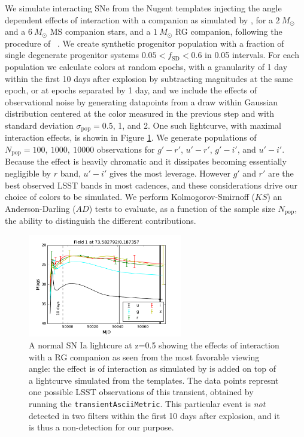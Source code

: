 We simulate interacting SNe from the Nugent templates \citep{Nugent02}
injecting the angle dependent effects of interaction with a companion
as simulated by \citep{Kasen10}, for a $2~M_\odot$ and a $6~M_\odot$
MS companion stars, and a $1~M_\odot$ RG companion, following the
procedure of ~\citep{Bianco11}. We create synthetic progenitor
population with a fraction of single degenerate progenitor systems
$0.05 < f_\mathrm{SD} < 0.6 $ in 0.05 intervals. For each population
we calculate colors at random epochs, with a granularity of 1 day
within the first 10 days after explosion by subtracting magnitudes at
the same epoch, or at epochs separated by 1 day, and we include the
effects of observational noise by generating datapoints from a draw
within Gaussian distribution centered at the color measured in the
previous step and with standard deviation $\sigma_\mathrm{pop} = 0.5$,
1, and 2. One such lightcurve, with maximal interaction effects, is showin in Figure \ref{fig:kasenlc}.
We generate populations of $N_\mathrm{pop}=100,
~1000,~10000$ observations for $g'-r'$, $u'-r'$, $g'-i'$, and
$u'-i'$. Because the effect is heavily chromatic and it dissipates
becoming essentially negligible by $r$ band, $u'-i'$ gives the most
leverage. However $g'$ and $r'$ are the best observed LSST bands in
most cadences, and these considerations drive our choice of colors to
be simulated. We perform Kolmogorov-Smirnoff ($KS$) an
Anderson-Darling ($AD$) tests to evaluate, as a function of the sample
size $N_\mathrm{pop}$, the ability to distinguish the different
contributions.

\begin{figure}[hbt]
\centerline{
\includegraphics[width=0.6\textwidth]{figs/transients/LSST_Kasen_lcv0.pdf}
}
\caption{ A normal SN Ia lightcure at z=0.5 showing the effects of
interaction with a RG companion as seen from the most favorable viewing
angle: the effect is of interaction as simulated by \citet{Kasen10} is
added on top of a lightcurve simulated from the \citealt{Nugent02}
templates. The data points represnt one possible LSST observations of
this transient, obtained by running the \texttt{transientAsciiMetric}.
This particular event is \emph{not} detected in two filters within the
first 10 days after explosion, and it is thus a non-detection for our
purpose.}
\label{fig:kasenlc}
\end{figure}

